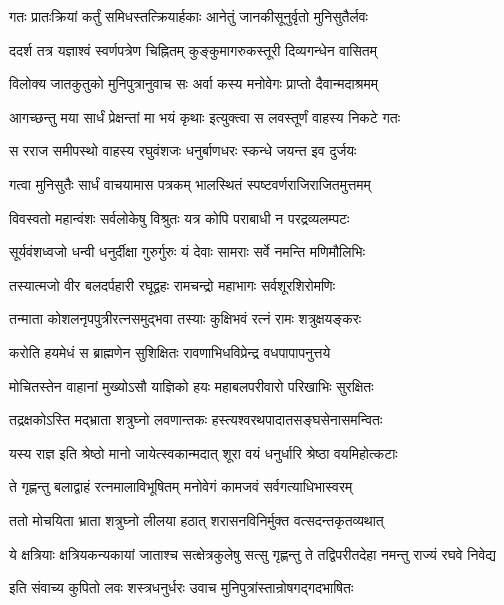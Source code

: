 \twolineshloka
{गतः प्रातःक्रियां कर्तुं समिधस्तत्क्रियार्हकाः}
{आनेतुं जानकीसूनुर्वृतो मुनिसुतैर्लवः}%

\twolineshloka
{ददर्श तत्र यज्ञाश्वं स्वर्णपत्रेण चिह्नितम्}
{कुङ्कुमागरुकस्तूरी दिव्यगन्धेन वासितम्}%

\twolineshloka
{विलोक्य जातकुतुको मुनिपुत्रानुवाच सः}
{अर्वा कस्य मनोवेगः प्राप्तो दैवान्मदाश्रमम्}%

\twolineshloka
{आगच्छन्तु मया सार्धं प्रेक्षन्तां मा भयं कृथाः}
{इत्युक्त्वा स लवस्तूर्णं वाहस्य निकटे गतः}%

\twolineshloka
{स रराज समीपस्थो वाहस्य रघुवंशजः}
{धनुर्बाणधरः स्कन्धे जयन्त इव दुर्जयः}%

\twolineshloka
{गत्वा मुनिसुतैः सार्धं वाचयामास पत्रकम्}
{भालस्थितं स्पष्टवर्णराजिराजितमुत्तमम्}%

\twolineshloka
{विवस्वतो महान्वंशः सर्वलोकेषु विश्रुतः}
{यत्र कोपि पराबाधी न परद्रव्यलम्पटः}%

\twolineshloka
{सूर्यवंशध्वजो धन्वी धनुर्दीक्षा गुरुर्गुरुः}
{यं देवाः सामराः सर्वे नमन्ति मणिमौलिभिः}%

\twolineshloka
{तस्यात्मजो वीर बलदर्पहारी रघूद्वहः}
{रामचन्द्रो महाभागः सर्वशूरशिरोमणिः}%

\twolineshloka
{तन्माता कोशलनृपपुत्रीरत्नसमुद्भवा}
{तस्याः कुक्षिभवं रत्नं रामः शत्रुक्षयङ्करः}%

\twolineshloka
{करोति हयमेधं स ब्राह्मणेन सुशिक्षितः}
{रावणाभिधविप्रेन्द्र वधपापापनुत्तये}%

\twolineshloka
{मोचितस्तेन वाहानां मुख्योऽसौ याज्ञिको हयः}
{महाबलपरीवारो परिखाभिः सुरक्षितः}%

\twolineshloka
{तद्रक्षकोऽस्ति मद्भ्राता शत्रुघ्नो लवणान्तकः}
{हस्त्यश्वरथपादातसङ्घसेनासमन्वितः}%

\twolineshloka
{यस्य राज्ञ इति श्रेष्ठो मानो जायेत्स्वकान्मदात्}
{शूरा वयं धनुर्धारि श्रेष्ठा वयमिहोत्कटाः}%

\twolineshloka
{ते गृह्णन्तु बलाद्वाहं रत्नमालाविभूषितम्}
{मनोवेगं कामजवं सर्वगत्याधिभास्वरम्}%

\twolineshloka
{ततो मोचयिता भ्राता शत्रुघ्नो लीलया हठात्}
{शरासनविनिर्मुक्त वत्सदन्तकृतव्यथात्}%

\fourlineindentedshloka
{ये क्षत्रियाः क्षत्रियकन्यकायां}
{जाताश्च सत्क्षेत्रकुलेषु सत्सु}
{गृह्णन्तु ते तद्विपरीतदेहा}
{नमन्तु राज्यं रघवे निवेद्य}%

\twolineshloka
{इति संवाच्य कुपितो लवः शस्त्रधनुर्धरः}
{उवाच मुनिपुत्रांस्तान्रोषगद्गदभाषितः}%

